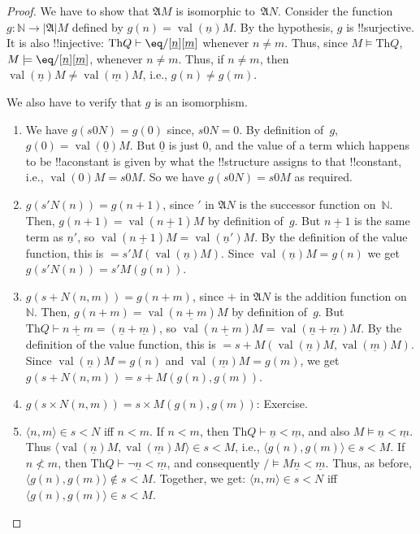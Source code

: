 \documentclass[10pt,a4paper]{article}
\theoremstyle{plain}
\theoremstyle{definition}
\theoremstyle{remark}
\providecommand{\Proves}{\mathrel{\vdash}}
\providecommand{\Obj}{}
\providecommand{\Struct}{\ensuremath{\mathfrak{A}}}
\providecommand{\Domain}{\ensuremath{|\mathfrak{A}|}}
\providecommand{\Assign}{\ensuremath{s}}
\providecommand{\Sat}[2]{\ensuremath{#1 \models #2}}
\providecommand{\Th}{\ensuremath{\mathrm{Th}}}
\providecommand{\tuple}[1]{\langle #1 \rangle}
\providecommand{\num}[1]{\underline{#1}}
\providecommand{\Nat}{\ensuremath{\mathbb{N}}}
\providecommand{\Value}[1]{\operatorname{val}(#1)}
\begin{document}
\begin{proof}
We have to show that $\Struct{M}$ is isomorphic
to~$\Struct{N}$. Consider the function $g\colon \Nat \to \Domain{M}$
defined by $g(n) = \Value{\num{n}}{M}$. By the hypothesis, $g$ is
!!{surjective}.  It is also !!{injective}: $\Th{Q} \Proves
\eq/[\num{n}][\num{m}]$ whenever $n \neq m$. Thus, since
$\Sat{M}{\Th{Q}}$, $\Sat{M}{\eq/[\num{n}][\num{m}]}$, whenever $n \neq
m$. Thus, if $n \neq m$, then $\Value{\num{n}}{M} \neq
\Value{\num{m}}{M}$, i.e., $g(n) \neq g(m)$.

We also have to verify that $g$ is an isomorphism.
\begin{enumerate}
\item We have $g(\Assign{\Obj{0}}{N}) = g(0)$ since,
  $\Assign{\Obj{0}}{N} = 0$. By definition of~$g$, $g(0) =
  \Value{\num{0}}{M}$. But $\num{0}$ is just $\Obj{0}$, and the value
  of a term which happens to be !!a{constant} is given by what the
  !!{structure} assigns to that !!{constant}, i.e.,
  $\Value{\Obj{0}}{M} = \Assign{\Obj{0}}{M}$. So we have
  $g(\Assign{\Obj{0}}{N}) = \Assign{\Obj{0}}{M}$ as required.
\item $g(\Assign{\prime}{N}(n)) = g(n+1)$, since $\prime$ in
  $\Struct{N}$ is the successor function on~$\Nat$. Then, $g(n+1) =
  \Value{\num{n+1}}{M}$ by definition of~$g$. But $\num{n+1}$ is the
  same term as $\num{n}'$, so $\Value{\num{n+1}}{M} =
  \Value{\num{n}'}{M}$. By the definition of the value function, this
  is $= \Assign{\prime}{M}(\Value{\num{n}}{M})$. Since
    $\Value{\num{n}}{M} = g(n)$ we get $g(\Assign{\prime}{N}(n)) =
  \Assign{\prime}{M}(g(n))$.
\item $g(\Assign{+}{N}(n,m)) = g(n+m)$, since $+$ in $\Struct{N}$ is
  the addition function on~$\Nat$. Then, $g(n+m) =
  \Value{\num{n+m}}{M}$ by definition of~$g$. But $\Th{Q} \Proves
  \num{n+m} = (\num{n} + \num{m})$, so $\Value{\num{n+m}}{M} =
  \Value{\num{n}+\num{m}}{M}$. By the definition of the value
  function, this is $=
  \Assign{+}{M}(\Value{\num{n}}{M},\Value{\num{m}}{M})$. Since
    $\Value{\num{n}}{M} = g(n)$ and $\Value{\num{m}}{M} = g(m)$, we
    get $g(\Assign{+}{N}(n, m)) = \Assign{+}{M}(g(n), g(m))$.
\item $g(\Assign{\times}{N}(n, m)) = \Assign{\times}{M}(g(n), g(m))$:
  Exercise.
\item $\tuple{n,m} \in \Assign{<}{N}$ iff $n < m$. If $n < m$, then
  $\Th{Q} \Proves \num{n} < \num{m}$, and also $\Sat{M}{\num{n} <
  \num{m}}$. Thus $\tuple{\Value{\num{n}}{M}, \Value{\num{m}}{M}} \in
  \Assign{<}{M}$, i.e., $\tuple{g(n), g(m)} \in \Assign{<}{M}$. If $n
  \not< m$, then $\Th{Q} \Proves \lnot \num{n} < \num{m}$, and
  consequently $\Sat/{M}{\num{n} < \num{m}}$. Thus, as before,
  $\tuple{g(n), g(m)} \notin \Assign{<}{M}$. Together, we get:
  $\tuple{n,m} \in \Assign{<}{N}$ iff $\tuple{g(n), g(m)} \in
  \Assign{<}{M}$.
\end{enumerate}
\end{proof}
\end{document}
